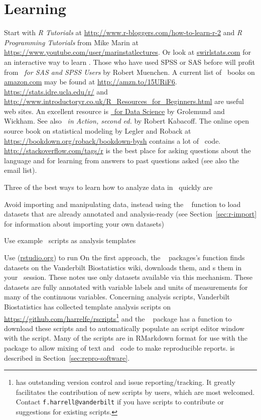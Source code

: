 \section{Learning \R}
Start with \emph{R Tutorials} at \url{http://www.r-bloggers.com/how-to-learn-r-2} and \emph{R Programming Tutorials} from Mike Marin at
\url{https://www.youtube.com/user/marinstatlectures}.  Or look at
\url{swirlstats.com} for an interactive way to learn \R. Those
who have used SPSS or SAS before will profit from \emph{\R\ for SAS
  and SPSS Users} by Robert Muenchen.  A current list of \R\ books on
\href{https://www.amazon.com/}{amazon.com} may be found at \url{http://amzn.to/15URiF6}.
\url{https://stats.idre.ucla.edu/r/} and
\url{http://www.introductoryr.co.uk/R_Resources_for_Beginners.html}
are useful web sites. 
An excellent resource is \href{https://r4ds.had.co.nz/}{\R\ for Data Science} by Grolemund and Wickham.
See also \emph{\R\ in Action, second ed.} by Robert 
Kabacoff.  The online open source book on statistical modeling by Legler and Roback at
\url{https://bookdown.org/roback/bookdown-bysh} contains a lot of \R\ code.
\url{http://stackoverflow.com/tags/r} is the best place for asking
questions about the language and for learning from answers to past questions
asked (see also the  email list).

Three of the best ways to learn how to analyze data in \R\ quickly are
\be
\item Avoid importing and manipulating data, instead using the \R\
   function to load datasets that are already annotated and
  analysis-ready (see Section~\ref{sec:r-import} for information about
  importing your own datasets)
\item Use example \R\ scripts as analysis templates
\item Use  (\href{https://www.rstudio.com/}{rstudio.org}) to run \R
\ee
On the first approach, the \R\  packages's 
function finds datasets on the Vanderbilt Biostatistics 
wiki, downloads them, and \co{load()}s them in your \R\ session.
These notes use only datasets available via this mechanism.  These
datasets are fully annotated with variable labels and units of
measurements for many of the continuous variables.
Concerning analysis scripts, Vanderbilt Biostatistics has collected
template analysis scripts on
\url{https://github.com/harrelfe/rscripts}\footnote{ has
  outstanding version control and issue reporting/tracking.  It
  greatly facilitates the contribution of new scripts by users, which
  are most welcomed.  Contact \texttt{f.harrell@vanderbilt} if you
  have scripts to contribute or suggestions for existing scripts.} and
the \R\ \co{Hmisc} package has a function \co{getRs} to download these
scripts and to automatically populate an 
 script editor window with the script.
Many of the scripts are in RMarkdown format for use with the \R\
 package to allow mixing of text and \R\ code to make
reproducible reports.  \co{knitr} is described in 
Section~\ref{sec:repro-software}.

